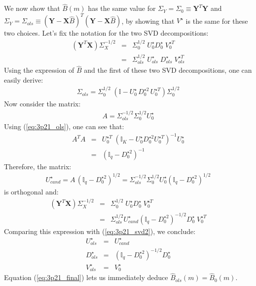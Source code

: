 \begin{itemize}
We now show that $\hat{B}(m)$ has the same value for $\Sigma_Y = \Sigma_{0} \equiv \mathbf{Y}^T \mathbf{Y}$ and  $\Sigma_Y = \Sigma_{ols} \equiv \left( \mathbf{Y} - \mathbf{X} \hat{B} \right)^T \left( \mathbf{Y} - \mathbf{X} \hat{B} \right)$, by showing that $V ^{\star}$ is the same for these two choices. Let's fix the notation for the two SVD decompositions:
\begin{eqnarray} \label{eq:3p21_svd1}
 (\mathbf{Y}^T \mathbf{X}) \Sigma_X^{-1/2} & = & \Sigma_{0}^{1/2} \;U_0 ^{\star} D_0 ^{\star}\; V_0 ^{\star T} \\
\label{eq:3p21_svd2} & = & \Sigma_{ols}^{1/2} \;U_{ols} ^{\star}\; D_{ols} ^{\star}\; V_{ols} ^{\star T}
\end{eqnarray}
Using the expression of $\hat{B}$ and the first of these two SVD decompositions, one can easily derive:
\begin{eqnarray} \label{eq:3p21_ols}
\Sigma_{ols} = \Sigma_{0}^{1/2} \;\left( \mathbb{I} - U_0 ^{\star}\, D ^{\star 2}_0\, U_0 ^{\star T} \right) \Sigma_{0}^{1/2}
\end{eqnarray}
Now consider the matrix:
\begin{eqnarray*}
A = \Sigma_{ols}^{-1/2} \Sigma_{0}^{1/2} U ^{\star}_0
\end{eqnarray*}
Using (\ref{eq:3p21_ols}), one can see that:
\begin{eqnarray*}
A^TA & = & U_0 ^{\star T} \; \left( \mathbb{I}_K - U ^{\star}_0 D ^{\star 2}_0 U_0 ^{\star T} \right)^{-1} U_0 ^{\star} \\
& = & \left( \mathbb{I}_q - D ^{\star 2}_0 \right)^{-1}
\end{eqnarray*}
Therefore, the matrix:
\begin{eqnarray*}
U ^{\star}_{cand}  =  A \, \left( \mathbb{I}_q - D ^{\star 2}_0 \right)^{1/2} = \Sigma_{ols}^{-1/2} \Sigma_{0}^{1/2} U ^{\star}_0 \left( \mathbb{I}_q - D ^{\star 2}_0 \right)^{1/2}
\end{eqnarray*}
is orthogonal and:
\begin{eqnarray*}
(\mathbf{Y}^T \mathbf{X}) \Sigma_X^{-1/2} & = & \Sigma_{0}^{1/2} \;U_0 ^{\star} D_0 ^{\star}\; V_0 ^{\star T}\\
& = & \Sigma_{ols} ^{1/2} U_{cand} ^{\star} \left( \mathbb{I}_q - D ^{\star 2}_0 \right)^{-1/2} D_0 ^{\star}\; V_0 ^{\star T}
\end{eqnarray*}
Comparing this expression with (\ref{eq:3p21_svd2}), we conclude:
\begin{eqnarray*}
U ^{\star}_{ols} & = & U ^{\star}_{cand} \\
D ^{\star}_{ols} & = & \left( \mathbb{I}_q - D ^{\star 2}_0 \right)^{-1/2} D_0 ^{\star} \\
V ^{\star}_{ols} & = & V ^{\star}_0
\end{eqnarray*}
Equation (\ref{eq:3p21_final}) lets us immediately deduce $\hat{B}_{ols}(m) = \hat{B}_0(m)$.
\end{itemize}